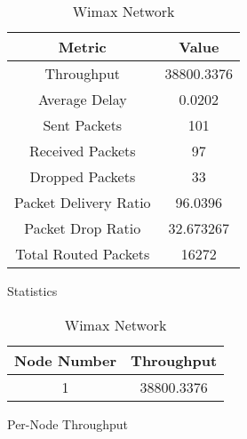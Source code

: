 \newline
\begin{table}[h!]
    \centering
    \begin{subtable}[t]{0.5\textwidth}
    \centering
        
    \begin{tabular}{|c|c|}
        \hline
        \textbf{Metric} & \textbf{Value} \\
        \hline
        Throughput &      38800.3376 \\
        \hline
        Average Delay &         0.0202 \\
        \hline
        Sent Packets &         101 \\ 
        \hline
        Received Packets &         97 \\
        \hline
        Dropped Packets &         33 \\
        \hline
        Packet Delivery Ratio &      96.0396 \\
        \hline
        Packet Drop Ratio &      32.673267 \\
        \hline
        Total Routed Packets & 16272 \\
        \hline
    \end{tabular}
    \caption{Statistics}
        
    \end{subtable}
    \begin{subtable}{0.5\textwidth}
    \centering
        \begin{tabular}{|c|c|}
            \hline
            \textbf{Node Number} & \textbf{Throughput} \\
            \hline
             1 & 38800.3376 \\
            \hline
        \end{tabular}
        \caption{Per-Node Throughput}
        
    \end{subtable}
    \caption{Wimax Network}
    \label{tab:2}
\end{table}
